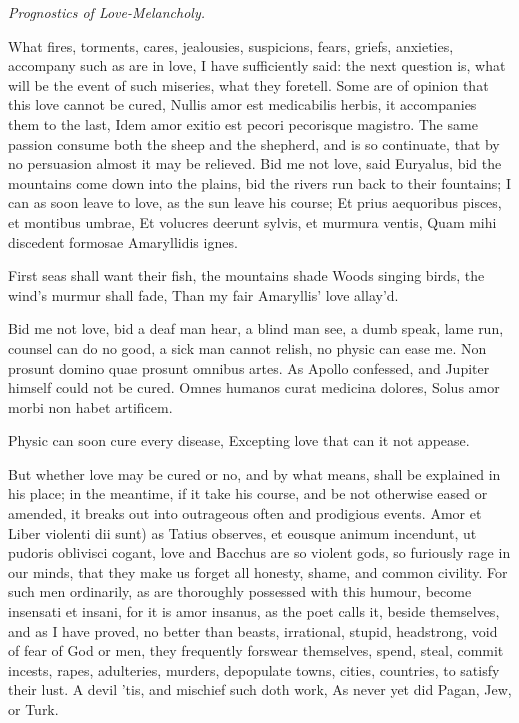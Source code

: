 {%

\emph{Prognostics of Love-Melancholy.}

What fires, torments, cares, jealousies, suspicions, fears, griefs,
anxieties, accompany such as are in love, I have sufficiently said: the
next question is, what will be the event of such miseries, what they
foretell. Some are of opinion that this love cannot be cured, Nullis
amor est medicabilis herbis, it accompanies them to the last,
Idem amor exitio est pecori pecorisque magistro. The same passion
consume both the sheep and the shepherd, and is so continuate, that by
no persuasion almost it may be relieved. Bid me not love, said
Euryalus, bid the mountains come down into the plains, bid the rivers
run back to their fountains; I can as soon leave to love, as the sun
leave his course;
Et prius aequoribus pisces, et montibus umbrae,
Et volucres deerunt sylvis, et murmura ventis,
Quam mihi discedent formosae Amaryllidis ignes.

First seas shall want their fish, the mountains shade
Woods singing birds, the wind's murmur shall fade,
Than my fair Amaryllis' love allay'd.

Bid me not love, bid a deaf man hear, a blind man see, a dumb speak,
lame run, counsel can do no good, a sick man cannot relish, no physic
can ease me. Non prosunt domino quae prosunt omnibus artes. As Apollo
confessed, and Jupiter himself could not be cured.
Omnes humanos curat medicina dolores,
Solus amor morbi non habet artificem.

Physic can soon cure every disease,
Excepting love that can it not appease.

But whether love may be cured or no, and by what means, shall be
explained in his place; in the meantime, if it take his course, and be
not otherwise eased or amended, it breaks out into outrageous often and
prodigious events. Amor et Liber violenti dii sunt) as Tatius
observes, et eousque animum incendunt, ut pudoris oblivisci cogant,
love and Bacchus are so violent gods, so furiously rage in our minds,
that they make us forget all honesty, shame, and common civility. For
such men ordinarily, as are thoroughly possessed with this humour,
become insensati et insani, for it is amor insanus, as the poet
calls it, beside themselves, and as I have proved, no better than
beasts, irrational, stupid, headstrong, void of fear of God or men,
they frequently forswear themselves, spend, steal, commit incests,
rapes, adulteries, murders, depopulate towns, cities, countries, to
satisfy their lust.
A devil 'tis, and mischief such doth work,
As never yet did Pagan, Jew, or Turk.

}
